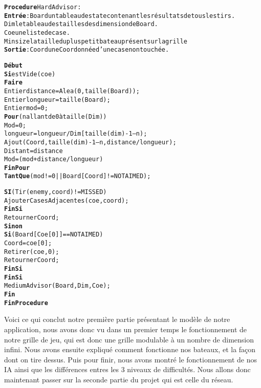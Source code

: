 \begin{alltt}
{\bf Procedure} HardAdvisor :
    {\bf Entrée} : Board un tableau de state contenant les résultats de tous les tirs.
              Dim le tableau des tailles des dimension de Board.
              Coe une liste de case.
              Minsize la taille du plus petit bateau présent sur la grille
    {\bf Sortie} : Coord une Coordonnée d’une case non touchée.

    {\bf Début}
        {\bf Si} estVide(coe)
            {\bf Faire}
                Entier distance = Alea(0, taille(Board)) ;
                Entier longueur = taille(Board) ;
                Entier mod = 0 ;
                {\bf Pour} (n allant de 0 à taille(Dim))
                    Mod = 0 ;	
                    longueur = longueur / Dim[taille(dim) - 1 – n) ;
                    Ajout(Coord, taille(dim) - 1 – n, distance / longueur) ;
                    Distant = distance % longueur
                    Mod = (mod + distance /longueur) % minsize;
                {\bf FinPour}
            {\bf Tant Que}(mod != 0 || Board[Coord] != NOTAIMED) ;

            {\bf SI} (Tir(enemy, coord) != MISSED)
                AjouterCasesAdjacentes(coe, coord) ;
            {\bf FinSi}   
            Retourner Coord ;
        {\bf Sinon}
            {\bf Si} (Board[Coe[0]] == NOTAIMED)
                Coord = coe[0] ;
                Retirer(coe, 0) ;
                Retourner Coord ;
            {\bf FinSi}
        {\bf FinSi}
        MediumAdvisor(Board, Dim, Coe) ;
    {\bf Fin}
{\bf Fin Procedure}
\end{alltt}
    
    Voici ce qui conclut notre première partie présentant le modèle de notre application, nous avons donc vu dans un premier temps le fonctionnement de notre grille de jeu, qui est donc une grille modulable à un nombre de dimension infini. Nous avons ensuite expliqué comment fonctionne nos bateaux, et la façon dont on tire dessus. Puis pour finir, nous avons montré le fonctionnement de nos IA ainsi que les différences entres les 3 niveaux de difficultés.
    Nous allons donc maintenant passer sur la seconde partie du projet qui est celle du réseau.